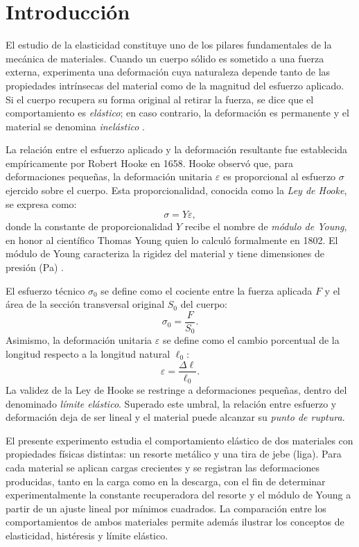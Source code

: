 
\section{Introducción}

El estudio de la elasticidad constituye uno de los pilares fundamentales de la mecánica
de materiales. Cuando un cuerpo sólido es sometido a una fuerza externa, experimenta
una deformación cuya naturaleza depende tanto de las propiedades intrínsecas del
material como de la magnitud del esfuerzo aplicado. Si el cuerpo recupera su forma
original al retirar la fuerza, se dice que el comportamiento es \textit{elástico}; en caso
contrario, la deformación es permanente y el material se denomina \textit{inelástico}
\cite{serway}.

La relación entre el esfuerzo aplicado y la deformación resultante fue establecida
empíricamente por Robert Hooke en 1658. Hooke observó que, para deformaciones
pequeñas, la deformación unitaria $\varepsilon$ es proporcional al esfuerzo $\sigma$
ejercido sobre el cuerpo. Esta proporcionalidad, conocida como la \textit{Ley de Hooke},
se expresa como:
\begin{equation}
    \sigma = Y\varepsilon,
\end{equation}
donde la constante de proporcionalidad $Y$ recibe el nombre de \textit{módulo de Young},
en honor al científico Thomas Young quien lo calculó formalmente en 1802. El módulo de
Young caracteriza la rigidez del material y tiene dimensiones de presión (\unit{\pascal})
\cite{halliday}.

El esfuerzo técnico $\sigma_0$ se define como el cociente entre la fuerza aplicada $F$ y
el área de la sección transversal original $S_0$ del cuerpo:
\begin{equation}
    \sigma_0 = \frac{F}{S_0}.
    \label{eq:esfuerzo}
\end{equation}
Asimismo, la deformación unitaria $\varepsilon$ se define como el cambio porcentual de la
longitud respecto a la longitud natural $\ell_0$:
\begin{equation}
    \varepsilon = \frac{\Delta\ell}{\ell_0}.
    \label{eq:deformacion}
\end{equation}
La validez de la Ley de Hooke se restringe a deformaciones pequeñas, dentro del
denominado \textit{límite elástico}. Superado este umbral, la relación entre esfuerzo y
deformación deja de ser lineal y el material puede alcanzar su \textit{punto de ruptura}.

El presente experimento estudia el comportamiento elástico de dos materiales con
propiedades físicas distintas: un resorte metálico y una tira de jebe (liga). Para cada
material se aplican cargas crecientes y se registran las deformaciones producidas, tanto
en la carga como en la descarga, con el fin de determinar experimentalmente la constante
recuperadora del resorte y el módulo de Young a partir de un ajuste lineal por mínimos
cuadrados. La comparación entre los comportamientos de ambos materiales permite además
ilustrar los conceptos de elasticidad, histéresis y límite elástico.